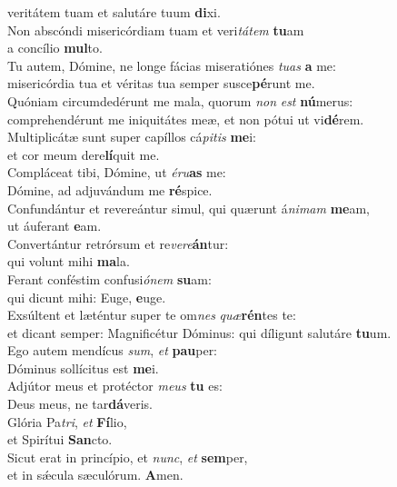 \oddverse veritátem tuam et salutáre tuum \textbf{di}xi.\\
\evenverse Non abscóndi misericórdiam tuam et veri\textit{tá}\textit{tem} \textbf{tu}am~\*\\
\evenverse a concílio \textbf{mul}to.\\
\oddverse Tu autem, Dómine, ne longe fácias miseratiónes \textit{tu}\textit{as} \textbf{a} me:~\*\\
\oddverse misericórdia tua et véritas tua semper susce\textbf{pé}runt me.\\
\evenverse Quóniam circumdedérunt me mala, quorum \textit{non} \textit{est} \textbf{nú}merus:~\*\\
\evenverse comprehendérunt me iniquitátes meæ, et non pótui ut vi\textbf{dé}rem.\\
\oddverse Multiplicátæ sunt super capíllos cá\textit{pi}\textit{tis} \textbf{me}i:~\*\\
\oddverse et cor meum dere\textbf{lí}quit me.\\
\evenverse Compláceat tibi, Dómine, ut \textit{é}\textit{ru}\textbf{as} me:~\*\\
\evenverse Dómine, ad adjuvándum me \textbf{ré}spice.\\
\oddverse Confundántur et revereántur simul, qui quærunt á\textit{ni}\textit{mam} \textbf{me}am,~\*\\
\oddverse ut áuferant \textbf{e}am.\\
\evenverse Convertántur retrórsum et re\textit{ve}\textit{re}\textbf{án}tur:~\*\\
\evenverse qui volunt mihi \textbf{ma}la.\\
\oddverse Ferant conféstim confusi\textit{ó}\textit{nem} \textbf{su}am:~\*\\
\oddverse qui dicunt mihi: Euge, \textbf{e}uge.\\
\evenverse Exsúltent et læténtur super te om\textit{nes} \textit{quæ}\textbf{rén}tes te:~\*\\
\evenverse et dicant semper: Magnificétur Dóminus: qui díligunt salutáre \textbf{tu}um.\\
\oddverse Ego autem mendícus \textit{sum}, \textit{et} \textbf{pau}per:~\*\\
\oddverse Dóminus sollícitus est \textbf{me}i.\\
\evenverse Adjútor meus et protéctor \textit{me}\textit{us} \textbf{tu} es:~\*\\
\evenverse Deus meus, ne tar\textbf{dá}veris.\\
\oddverse Glória Pa\textit{tri}, \textit{et} \textbf{Fí}lio,~\*\\
\oddverse et Spirítui \textbf{San}cto.\\
\evenverse Sicut erat in princípio, et \textit{nunc}, \textit{et} \textbf{sem}per,~\*\\
\evenverse et in sǽcula sæculórum. \textbf{A}men.\\

